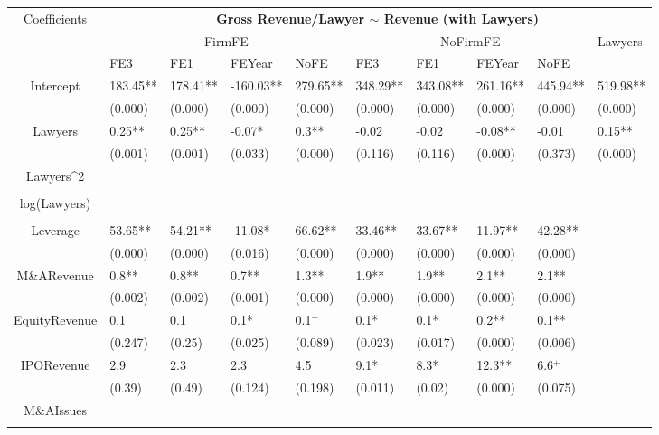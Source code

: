 \documentclass{article}
\begin{document}
\begin{table}[H]
\centering
\begin{tabular}{|clllllllll|}
\hline
\multirow{3}{*}{Coefficients} & \multicolumn{9}{c|}{\textbf{Gross Revenue/Lawyer $\sim$ Revenue (with Lawyers)}} \\
\cline{2-10}
& \multicolumn{4}{c}{FirmFE} & \multicolumn{4}{c}{NoFirmFE} & \multirow{2}{*}{Lawyers} \\
\cline{2-9}
& FE3 & FE1 & FEYear & NoFE & FE3 & FE1 & FEYear & NoFE &  \\
\hline
 
Intercept & 183.45** & 178.41** & -160.03** & 279.65** & 348.29** & 343.08** & 261.16** & 445.94** & 519.98** \\ 
   & (0.000) & (0.000) & (0.000) & (0.000) & (0.000) & (0.000) & (0.000) & (0.000) & (0.000) \\ 
  Lawyers & 0.25** & 0.25** & -0.07* & 0.3** & -0.02 & -0.02 & -0.08** & -0.01 & 0.15** \\ 
   & (0.001) & (0.001) & (0.033) & (0.000) & (0.116) & (0.116) & (0.000) & (0.373) & (0.000) \\ 
  Lawyers^2 &  &  &  &  &  &  &  &  &  \\ 
   &  &  &  &  &  &  &  &  &  \\ 
  log(Lawyers) &  &  &  &  &  &  &  &  &  \\ 
   &  &  &  &  &  &  &  &  &  \\ 
  Leverage & 53.65** & 54.21** & -11.08* & 66.62** & 33.46** & 33.67** & 11.97** & 42.28** &  \\ 
   & (0.000) & (0.000) & (0.016) & (0.000) & (0.000) & (0.000) & (0.000) & (0.000) &  \\ 
  M\&ARevenue & 0.8** & 0.8** & 0.7** & 1.3** & 1.9** & 1.9** & 2.1** & 2.1** &  \\ 
   & (0.002) & (0.002) & (0.001) & (0.000) & (0.000) & (0.000) & (0.000) & (0.000) &  \\ 
  EquityRevenue & 0.1 & 0.1 & 0.1* & 0.1$^{+}$ & 0.1* & 0.1* & 0.2** & 0.1** &  \\ 
   & (0.247) & (0.25) & (0.025) & (0.089) & (0.023) & (0.017) & (0.000) & (0.006) &  \\ 
  IPORevenue & 2.9 & 2.3 & 2.3 & 4.5 & 9.1* & 8.3* & 12.3** & 6.6$^{+}$ &  \\ 
   & (0.39) & (0.49) & (0.124) & (0.198) & (0.011) & (0.02) & (0.000) & (0.075) &  \\ 
  M\&AIssues &  &  &  &  &  &  &  &  &  \\ 
   &  &  &  &  &  &  &  &  &  \\ 

\end{tabular}
\end{table}
\end{document}
